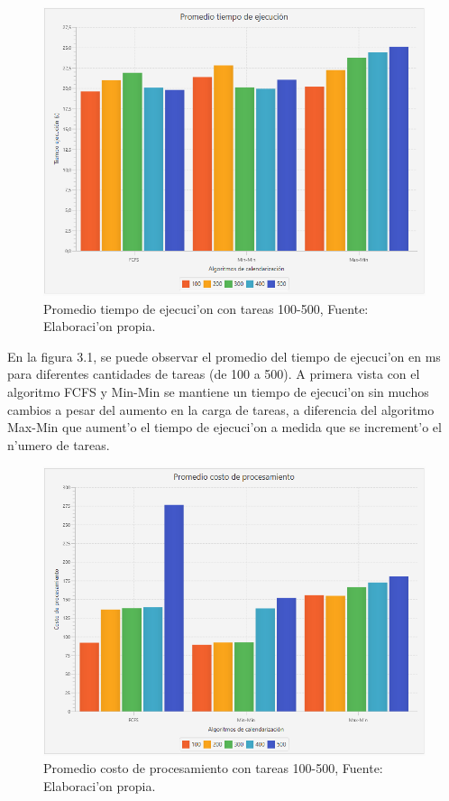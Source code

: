 \begin{figure}
	\caption{Promedio tiempo de ejecuci'on con tareas 100-500, Fuente: Elaboraci'on propia.}
	\centering
	\includegraphics[scale=0.5]{media/tiempoejecucion}
\end{figure}

En la figura 3.1, se puede observar el promedio del tiempo de ejecuci'on en ms para diferentes cantidades de tareas (de 100 a 500). A primera vista con el algoritmo FCFS y Min-Min se mantiene un tiempo de ejecuci'on sin muchos cambios a pesar del aumento en la carga de tareas, a diferencia del algoritmo Max-Min que aument'o el tiempo de ejecuci'on a medida que se increment'o el n'umero de tareas.

\begin{figure}
	\caption{Promedio costo de procesamiento con tareas 100-500, Fuente: Elaboraci'on propia.}
	\centering
	\includegraphics[scale=0.5]{media/costoproce}
\end{figure}


